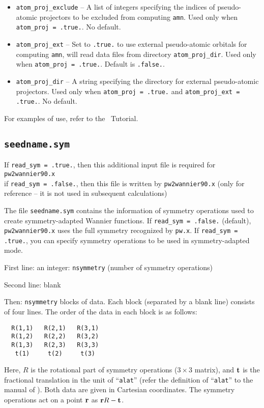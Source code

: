 \begin{itemize}
\item \verb#atom_proj_exclude# -- A list of integers specifying the indices of pseudo-atomic projectors to be excluded from computing \verb#amn#. Used only when \verb#atom_proj = .true.#. No default.

\item \verb#atom_proj_ext# -- Set to \verb#.true.# to use external pseudo-atomic orbitals for computing \verb#amn#, will read data files from directory \verb#atom_proj_dir#. Used only when \verb#atom_proj = .true.#. Default is \verb#.false.#.

\item \verb#atom_proj_dir# -- A string specifying the directory for external pseudo-atomic projectors. Used only when \verb#atom_proj = .true.# and \verb#atom_proj_ext = .true.#. No default.


\end{itemize}

For examples of use, refer to the \wannier\ Tutorial.


\subsection{{\tt seedname.sym}}

If \verb#read_sym = .true.#, then this additional input file is required for {\tt pw2wannier90.x}\\ 
if \verb#read_sym = .false.#, then this file is written by {\tt pw2wannier90.x} (only for reference -- 
it is not used in subsequent calculations)

The file \verb#seedname.sym# contains the information of symmetry operations used to create symmetry-adapted Wannier functions.  
If \verb#read_sym = .false.# (default), {\tt pw2wannier90.x} uses the full symmetry recognized by {\tt pw.x}. 
If \verb#read_sym = .true.#, you can specify symmetry operations to be used in symmetry-adapted mode.  


First line: an integer: \verb#nsymmetry# (number of symmetry operations)

Second line: blank
 
Then:   \verb#nsymmetry# blocks of data.  
Each block (separated by a blank line) consists of four lines.  
The order of the data in each block is as follows: 
\begin{verbatim}
  R(1,1)   R(2,1)   R(3,1)
  R(1,2)   R(2,2)   R(3,2)
  R(1,3)   R(2,3)   R(3,3)
   t(1)     t(2)     t(3)   
\end{verbatim}
Here, $R$ is the rotational part of symmetry operations ($3\times3$ matrix), and  $\bf t$ is the fractional translation in the unit of ``\verb#alat#'' (refer the definition of ``\verb#alat#'' to the manual of \pwscf). 
Both data are given in Cartesian coordinates. 
The symmetry operations act on a point $\bf r$ as ${\bf r} R - {\bf t}$. 
